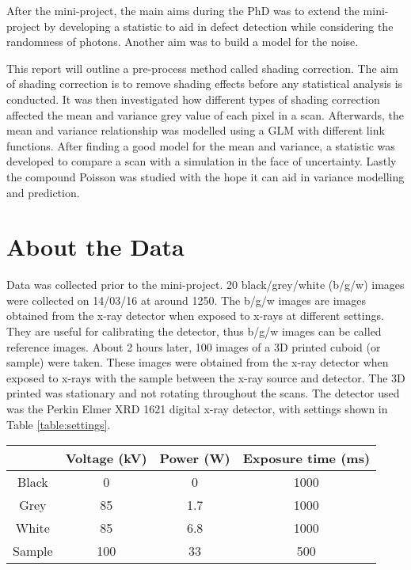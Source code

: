 \documentclass[a4paper]{proc}
\begin{document}
After the mini-project, the main aims during the PhD was to extend the mini-project by developing a statistic to aid in defect detection while considering the randomness of photons. Another aim was to build a model for the noise.

This report will outline a pre-process method called shading correction. The aim of shading correction is to remove shading effects before any statistical analysis is conducted. It was then investigated how different types of shading correction affected the mean and variance grey value of each pixel in a scan. Afterwards, the mean and variance relationship was modelled using a GLM with different link functions. After finding a good model for the mean and variance, a statistic was developed to compare a scan with a simulation in the face of uncertainty. Lastly the compound Poisson was studied with the hope it can aid in variance modelling and prediction.

\section{About the Data}
Data was collected prior to the mini-project. 20 black/grey/white (b/g/w) images were collected on 14/03/16 at around 1250. The b/g/w images are images obtained from the x-ray detector when exposed to x-rays at different settings. They are useful for calibrating the detector, thus b/g/w images can be called reference images. About 2 hours later, 100 images of a 3D printed cuboid (or sample) were taken. These images were obtained from the x-ray detector when exposed to x-rays with the sample between the x-ray source and detector. The 3D printed was stationary and not rotating throughout the scans. The detector used was the Perkin Elmer XRD 1621 digital x-ray detector, with settings shown in Table \ref{table:settings}.

\begin{table*}
	\centering
	\begin{tabular}{c|c|c|c}
		& Voltage (kV) & Power (W) & Exposure time (ms) \\
		\hline
		Black & 0 & 0 & 1000\\
		Grey & 85 & 1.7 & 1000\\
		White & 85 & 6.8 & 1000 \\
		Sample & 100 & 33 & 500
	\end{tabular}
	\caption{Setting of the x-ray CT scan when collecting images from the x-ray detector. Error bars were not given and the number of significant figures shown are as given.}
	\label{table:settings}
\end{table*}
\end{document}
